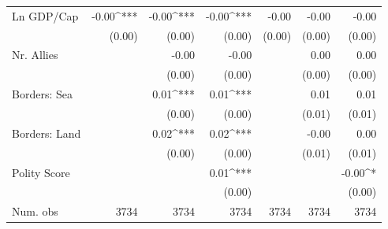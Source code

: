 \begin{table}
\begin{center}
{\begin{tabular}{l D{.}{.}{4.5} D{.}{.}{4.5} D{.}{.}{4.5} D{.}{.}{4.4} D{.}{.}{4.4} D{.}{.}{4.3}}
Ln GDP/Cap               & -0.00^{***}                 & -0.00^{***}                 & -0.00^{***}                 & -0.00                       & -0.00                       & -0.00                       \\
                         & (0.00)                      & (0.00)                      & (0.00)                      & (0.00)                      & (0.00)                      & (0.00)                      \\
Nr. Allies               &                             & -0.00                       & -0.00                       &                             & 0.00                        & 0.00                        \\
                         &                             & (0.00)                      & (0.00)                      &                             & (0.00)                      & (0.00)                      \\
Borders: Sea             &                             & 0.01^{***}                  & 0.01^{***}                  &                             & 0.01                        & 0.01                        \\
                         &                             & (0.00)                      & (0.00)                      &                             & (0.01)                      & (0.01)                      \\
Borders: Land            &                             & 0.02^{***}                  & 0.02^{***}                  &                             & -0.00                       & 0.00                        \\
                         &                             & (0.00)                      & (0.00)                      &                             & (0.01)                      & (0.01)                      \\
Polity Score             &                             &                             & 0.01^{***}                  &                             &                             & -0.00^{*}                   \\
                         &                             &                             & (0.00)                      &                             &                             & (0.00)                      \\
\midrule
Num. obs                 & 3734                        & 3734                        & 3734                        & 3734                        & 3734                        & 3734                        \\

\end{tabular}}
\end{center}
\end{table}
